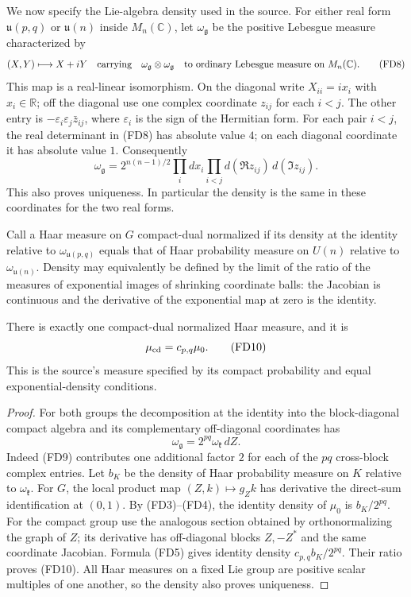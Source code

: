 We now specify the Lie-algebra density used in the source.
For either real form $\mathfrak u(p,q)$ or $\mathfrak u(n)$
inside $M_n(\mathbb C)$, let $\omega_{\mathfrak g}$ be the
positive Lebesgue measure characterized by
\[
 (X,Y)\longmapsto X+iY
       \quad\hbox{carrying}\quad
 \omega_{\mathfrak g}\otimes\omega_{\mathfrak g}
       \quad\hbox{to ordinary Lebesgue measure on }M_n(\mathbb C).
 \tag{FD8}
\]
This map is a real-linear isomorphism. On the diagonal write
$X_{ii}=ix_i$ with $x_i\in\mathbb R$; off the diagonal
use one complex coordinate $z_{ij}$ for each $i<j$.
The other entry is $-\varepsilon_i\varepsilon_j\bar z_{ij}$,
where $\varepsilon_i$ is the sign of the Hermitian form.
For each pair $i<j$, the real determinant in (FD8) has
absolute value $4$; on each diagonal coordinate it has
absolute value $1$. Consequently
\[
 \omega_{\mathfrak g}
    =2^{n(n-1)/2}\prod_i dx_i
                  \prod_{i<j}d(\Re z_{ij})\,d(\Im z_{ij}).
 \tag{FD9}
\]
This also proves uniqueness. In particular the density is
the same in these coordinates for the two real forms.

Call a Haar measure on $G$ compact-dual normalized if its
density at the identity relative to $\omega_{\mathfrak u(p,q)}$
equals that of Haar probability measure on $U(n)$ relative
to $\omega_{\mathfrak u(n)}$. Density may equivalently be
defined by the limit of the ratio of the measures of
exponential images of shrinking coordinate balls: the
Jacobian is continuous and the derivative of the exponential
map at zero is the identity.

\begin{proposition}\label{fd-measure-match}
There is exactly one compact-dual normalized Haar measure, and it is
\[
                             \mu_{\rm cd}=c_{p,q}\mu_0.
 \tag{FD10}\label{fd-cd-measure}
\]
This is the source's measure specified by its compact
probability and equal exponential-density conditions.
\end{proposition}
\begin{proof}
For both groups the decomposition at the identity into
the block-diagonal compact algebra and its complementary
off-diagonal coordinates has
\[
          \omega_{\mathfrak g}
                =2^{pq}\omega_{\mathfrak k}\,dZ.
 \tag{FD11}
\]
Indeed (FD9) contributes one additional factor $2$ for
each of the $pq$ cross-block complex entries.
Let $b_K$ be the density of Haar probability measure on
$K$ relative to $\omega_{\mathfrak k}$.
For $G$, the local product map $(Z,k)\mapsto g_Zk$ has
derivative the direct-sum identification at $(0,1)$.
By (FD3)--(FD4), the identity density of $\mu_0$ is
$b_K/2^{pq}$.
For the compact group use the analogous section obtained
by orthonormalizing the graph of $Z$; its derivative has
off-diagonal blocks $Z,-Z^*$ and the same coordinate
Jacobian. Formula (FD5) gives identity density
$c_{p,q}b_K/2^{pq}$.
Their ratio proves (FD10). All Haar measures on a fixed
Lie group are positive scalar multiples of one another,
so the density also proves uniqueness.
\end{proof}

